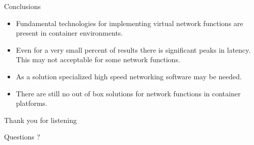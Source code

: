 \documentclass{beamer}
\begin{document}
\begin{frame}{Conclusions}
 \begin{itemize}
  \item Fundamental technologies for implementing virtual network functions are
  present in container environments.
  \item Even for a very small percent of results there is significant peaks in latency. This
  may not acceptable for some network functions.
  \item As a solution specialized high speed networking software may be needed.
  \item There are still no out of box solutions for network functions in container platforms.
 \end{itemize}

\end{frame}


\begin{frame}
 \begin{center}
 \Huge Thank you for listening
 \end{center}
\end{frame}

\begin{frame}
 \begin{center}
 \Huge Questions ?
 \end{center}
\end{frame}
\end{document}
